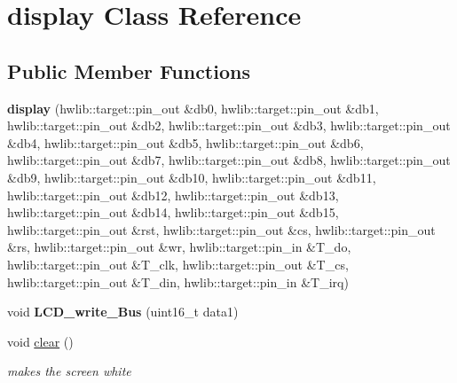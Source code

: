 \hypertarget{classdisplay}{}\section{display Class Reference}
\label{classdisplay}
\subsection*{Public Member Functions}
\begin{DoxyCompactItemize}
\item 
\mbox{\label{classdisplay_a0425b78e4b91c1e1dcfa22f899787ce8}} 
{\bfseries display} (hwlib\+::target\+::pin\+\_\+out \&db0, hwlib\+::target\+::pin\+\_\+out \&db1, hwlib\+::target\+::pin\+\_\+out \&db2, hwlib\+::target\+::pin\+\_\+out \&db3, hwlib\+::target\+::pin\+\_\+out \&db4, hwlib\+::target\+::pin\+\_\+out \&db5, hwlib\+::target\+::pin\+\_\+out \&db6, hwlib\+::target\+::pin\+\_\+out \&db7, hwlib\+::target\+::pin\+\_\+out \&db8, hwlib\+::target\+::pin\+\_\+out \&db9, hwlib\+::target\+::pin\+\_\+out \&db10, hwlib\+::target\+::pin\+\_\+out \&db11, hwlib\+::target\+::pin\+\_\+out \&db12, hwlib\+::target\+::pin\+\_\+out \&db13, hwlib\+::target\+::pin\+\_\+out \&db14, hwlib\+::target\+::pin\+\_\+out \&db15, hwlib\+::target\+::pin\+\_\+out \&rst, hwlib\+::target\+::pin\+\_\+out \&cs, hwlib\+::target\+::pin\+\_\+out \&rs, hwlib\+::target\+::pin\+\_\+out \&wr, hwlib\+::target\+::pin\+\_\+in \&T\+\_\+do, hwlib\+::target\+::pin\+\_\+out \&T\+\_\+clk, hwlib\+::target\+::pin\+\_\+out \&T\+\_\+cs, hwlib\+::target\+::pin\+\_\+out \&T\+\_\+din, hwlib\+::target\+::pin\+\_\+in \&T\+\_\+irq)
\item 
\mbox{\label{classdisplay_aed272c6c723e2fd976d436e32807e1d5}} 
void {\bfseries L\+C\+D\+\_\+write\+\_\+\+Bus} (uint16\+\_\+t data1)
\item 
\mbox{\label{classdisplay_a3943c805196989ec323e74bb5a313e25}} 
void \hyperlink{classdisplay_a3943c805196989ec323e74bb5a313e25}{clear} ()
\begin{DoxyCompactList}\small\item\em make\textquotesingle{}s the screen white \end{DoxyCompactList}\item 
\mbox{\label{classdisplay_a65036271ee5031dcc04a9e53e013e5d4}} 

\end{DoxyCompactItemize}
